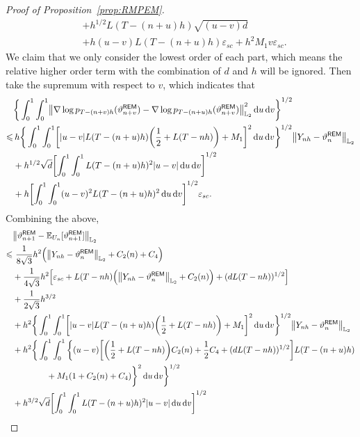\begin{proof}[Proof of Proposition~\ref{prop:RMPEM}]
\begin{align*}
    &+h^{1/2}L(T-(n+u)h)\sqrt{(u-v)d}\\
    &+h(u-v)L(T-(n+u)h)\varepsilon_{sc}+h^2M_1v\varepsilon_{sc}.
\end{align*}
We claim that we only consider the lowest order of each part, which means the relative higher order term with the combination of $d$ and $h$ will be ignored. Then take the supremum with respect to $v$, which indicates that
\begin{equation}
    \begin{aligned}
        &\bigg\{\int_0^1\int_0^1\left\lVert \nabla\log p_{T-(n+v)h}(\vartheta_{n+v}^{\sf REM})-\nabla\log p_{T-(n+u)h}(\vartheta_{n+v}^{\sf REM})\right\rVert_{\Ltwo}^2\rmd u\rmd v\bigg\}^{1/2}\\
        \leqslant& \, h\bigg\{\int_0^1\int_0^1\left[|u-v|L(T-(n+u)h)\left(\dfrac{1}{2}+L(T-nh)\right)+M_1\right]^2\rmd u\rmd v\bigg\}^{1/2}\l|Y_{nh}-\vartheta_n^{\sf REM}\r|_{\Ltwo}\\
        &+h^{1/2}\sqrt{d}\left[\int_0^1\int_0^1L(T-(n+u)h)^2|u-v|\rmd u\rmd v\right]^{1/2}\\
        &+h\left[\int_0^1\int_0^1(u-v)^2L(T-(n+u)h)^2\rmd u\rmd v\right]^{1/2}\varepsilon_{sc}.
    \end{aligned}
    \label{eq:diffscore}
\end{equation}
Combining the above,
\begin{align*}
    &\l|\vartheta_{n+1}^{\sf REM}-\mathbb{E}_{U_n}[\vartheta_{n+1}^{\sf REM}]\r|_{\Ltwo}\\
    \leqslant & \,\,\dfrac{1}{8\sqrt{3}}h^2\left(\l|Y_{nh}-\vartheta_n^{\sf REM}\r|_{\Ltwo}+C_2(n)+C_4\right)\\
    &+\dfrac{1}{4\sqrt{3}}h^2\left[\varepsilon_{sc}+L(T-nh)\left(\l|Y_{nh}-\vartheta_n^{\sf REM}\r|_{\Ltwo}+C_2(n)\right)+(dL(T-nh))^{1/2}\right]\\
    &+\dfrac{1}{2\sqrt{3}}h^{3/2}\\
    &+ h^2\bigg\{\int_0^1\int_0^1\left[|u-v|L(T-(n+u)h)\left(\dfrac{1}{2}+L(T-nh)\right)+M_1\right]^2\rmd u\rmd v\bigg\}^{1/2}\l|Y_{nh}-\vartheta_n^{\sf REM}\r|_{\Ltwo}\\
    &+h^2\bigg\{\int_0^1\int_0^1\bigg\{(u-v)\left[\left(\dfrac{1}{2}+L(T-nh)\right)C_2(n)+\dfrac{1}{2}C_4+(dL(T-nh))^{1/2}\right]L(T-(n+u)h)\\
    &\qquad\qquad+M_1(1+C_2(n)+C_4)\bigg\}^2\rmd u\rmd v\bigg\}^{1/2}\\
    &+h^{3/2}\sqrt{d}\left[\int_0^1\int_0^1L(T-(n+u)h)^2|u-v|\rmd u\rmd v\right]^{1/2}\\

\end{align*}
\end{proof}
